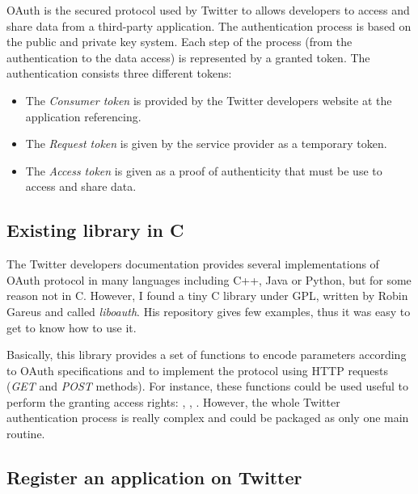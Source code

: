 \clearpage

OAuth is the secured protocol used by Twitter to allows developers to access and share data from a third-party application. The authentication process is based on the public and private key system. Each step of the process (from the authentication to the data access) is represented by a granted token. The authentication consists three different tokens:
\begin{itemize}
\item The \textit{Consumer token} is provided by the Twitter developers website at the application referencing.
\item The \textit{Request token} is given by the service provider as a temporary token.
\item The \textit{Access token} is given as a proof of authenticity that must be use to access and share data.
\end{itemize}


\subsection{Existing library in C}


\hspace{15mm}The Twitter developers documentation provides several implementations of OAuth protocol in many languages including C++, Java or Python, but for some reason not in C. However, I found a tiny C library under GPL, written by Robin Gareus and called \textit{liboauth}. His repository gives few examples, thus it was easy to get to know how to use it.

Basically, this library provides a set of functions to encode parameters according to OAuth specifications and to implement the protocol using HTTP requests (\textit{GET} and \textit{POST} methods). For instance, these functions could be used useful to perform the granting access rights: , , . However, the whole Twitter authentication process is really complex and could be packaged as only one main routine.


\subsection{Register an application on Twitter}

